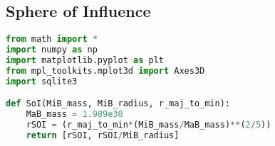 \subsection{Sphere of Influence}
\begin{lstlisting}[language=python, caption=SoI]
from math import *
import numpy as np
import matplotlib.pyplot as plt
from mpl_toolkits.mplot3d import Axes3D
import sqlite3

def SoI(MiB_mass, MiB_radius, r_maj_to_min):
    MaB_mass = 1.989e30
    rSOI = (r_maj_to_min*(MiB_mass/MaB_mass)**(2/5))
    return [rSOI, rSOI/MiB_radius]
\end{lstlisting}